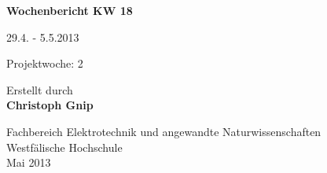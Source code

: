
\begin{center}
{\Huge \textbf{Wochenbericht KW 18}\par}
\vspace{1cm}
{\Huge 29.4. - 5.5.2013\par}
\vspace{1cm}
{\Huge Projektwoche: 2\par}

\vspace{2cm}

\large{Erstellt durch}\\
\Large{\textbf{Christoph Gnip}}


\vfill

{\normalsize Fachbereich Elektrotechnik und angewandte Naturwissenschaften\\
Westfälische Hochschule\\[2ex]Mai 2013}


\end{center}
\newpage